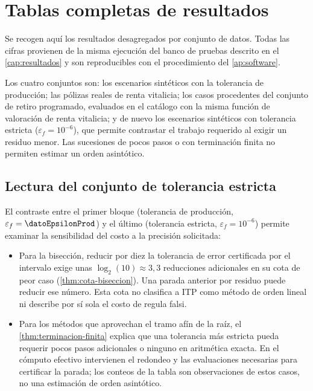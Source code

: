 \chapter{Tablas completas de resultados}
\label{ap:tablas}

Se recogen aquí los resultados desagregados por conjunto de datos. Todas las
cifras provienen de la misma ejecución del banco de pruebas descrito en el
\cref{cap:resultados} y son reproducibles con el procedimiento del
\cref{ap:software}.

Los cuatro conjuntos son: los \datoNSinteticos{} escenarios sintéticos con la
tolerancia de producción; las \datoNReales{} pólizas reales de renta vitalicia;
los \datoNRealesRP{} casos procedentes del conjunto de retiro programado,
evaluados en el catálogo con la misma función de valoración de renta vitalicia;
y de nuevo los escenarios sintéticos con tolerancia estricta
($\varepsilon_f=10^{-6}$), que permite contrastar el trabajo requerido al
exigir un residuo menor. Las sucesiones de pocos pasos o con terminación
finita no permiten estimar un orden asintótico.

\begin{center}
\small

\end{center}

\section*{Lectura del conjunto de tolerancia estricta}

El contraste entre el primer bloque (tolerancia de producción,
$\varepsilon_f=\datoEpsilonProd$) y el último (tolerancia estricta,
$\varepsilon_f=10^{-6}$) permite examinar la sensibilidad del costo a la
precisión solicitada:

\begin{itemize}[leftmargin=*]
  \item Para la bisección, reducir por diez la tolerancia de error certificada
        por el intervalo exige unas $\log_2(10)\approx3{,}3$ reducciones
        adicionales en su cota de peor caso (\cref{thm:cota-biseccion}). Una
        parada anterior por residuo puede reducir ese número. Esta cota no
        clasifica a ITP como método de orden lineal ni describe por sí sola
        el costo de regula falsi.
  \item Para los métodos que aprovechan el tramo afín de la raíz, el
        \cref{thm:terminacion-finita} explica que una tolerancia más estricta
        pueda requerir pocos pasos adicionales o ninguno en aritmética exacta.
        En el cómputo efectivo intervienen el redondeo y las evaluaciones
        necesarias para certificar la parada; los conteos de la tabla son
        observaciones de estos casos, no una estimación de orden asintótico.
\end{itemize}

